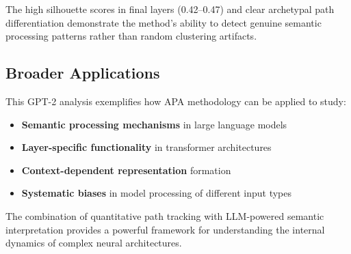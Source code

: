 The high silhouette scores in final layers (0.42--0.47) and clear archetypal path differentiation demonstrate the method's ability to detect genuine semantic processing patterns rather than random clustering artifacts.

\subsection{Broader Applications}

This GPT-2 analysis exemplifies how APA methodology can be applied to study:

\begin{itemize}
    \item \textbf{Semantic processing mechanisms} in large language models
    \item \textbf{Layer-specific functionality} in transformer architectures  
    \item \textbf{Context-dependent representation} formation
    \item \textbf{Systematic biases} in model processing of different input types
\end{itemize}

The combination of quantitative path tracking with LLM-powered semantic interpretation provides a powerful framework for understanding the internal dynamics of complex neural architectures.